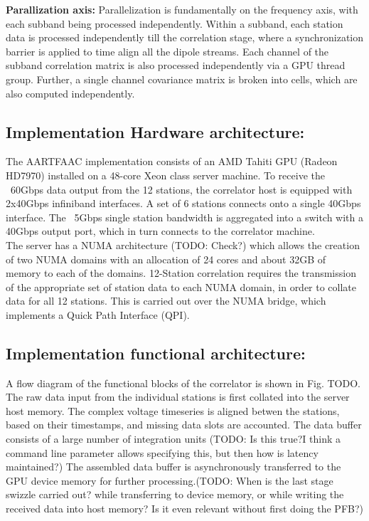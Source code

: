 \documentclass{aa}
\begin{document}
\textbf {Parallization axis:} Parallelization  is fundamentally on the frequency
axis, with  each subband being  processed independently. Within a  subband, each
station  data is  processed independently  till the  correlation stage,  where a
synchronization barrier  is applied to time  align all the dipole  streams. Each
channel of the subband correlation matrix  is also processed independently via a
GPU thread  group. Further, a  single channel  covariance matrix is  broken into
cells, which are also computed independently.

\subsection  {Implementation  Hardware  architecture:} The  AARTFAAC  implementation
consists of an AMD Tahiti GPU (Radeon  HD7970) installed on a 48-core Xeon class
server machine.   To receive the ~60Gbps  data output from the  12 stations, the
correlator host  is equipped with  2x40Gbps infiniband  interfaces.  A set  of 6
stations connects  onto a  single 40Gbps interface.   The ~5Gbps  single station
bandwidth is aggregated into  a switch with a 40Gbps output  port, which in turn
connects to the correlator machine.\\

The server has  a NUMA architecture (TODO: Check?) which  allows the creation of
two NUMA domains with an allocation of 24 cores and about 32GB of memory to each
of  the  domains.  12-Station  correlation  requires  the  transmission  of  the
appropriate set of  station data to each  NUMA domain, in order  to collate data
for all 12 stations. This is carried  out over the NUMA bridge, which implements
a Quick Path Interface (QPI).

 
\subsection {Implementation  functional  architecture:}   A  flow  diagram  of  the
functional blocks of the  correlator is shown in Fig. TODO.   The raw data input
from the individual stations is first  collated into the server host memory. The
complex  voltage timeseries  is  aligned  betwen the  stations,  based on  their
timestamps, and missing data slots are  accounted. The data buffer consists of a
large number  of integration units  (TODO: Is this  true?I think a  command line
parameter  allows specifying  this, but  then how  is latency  maintained?)  The
assembled data buffer is asynchronously transferred to the GPU device memory for
further  processing.(TODO: When  is the  last stage  swizzle carried  out? while
transferring to  device memory,  or while  writing the  received data  into host
memory? Is it even relevant without first doing the PFB?)
\end{document}
